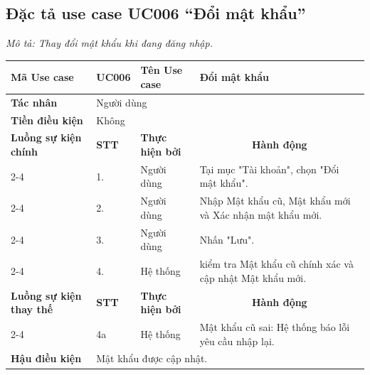 \documentclass[../main.tex]{subfiles}
\begin{document}
\subsection{Đặc tả use case UC006 ``Đổi mật khẩu''}
\textit{Mô tả: Thay đổi mật khẩu khi đang đăng nhập.}
\vspace{0.5cm}

\begingroup
\renewcommand{\arraystretch}{1.5}

\begin{longtable}{|p{2.7cm}|p{0.8cm}|p{2.6cm}|p{7.3cm}|}
\hline
\cellcolor[HTML]{D5F5E3}\textbf{Mã Use case} & \multicolumn{1}{l|}{UC006} & \cellcolor[HTML]{D5F5E3}\textbf{Tên Use case} & Đổi mật khẩu \\ \hline
\cellcolor[HTML]{D5F5E3}\textbf{Tác nhân} & \multicolumn{3}{p{10.7cm}|}{Người dùng} \\ \hline
\cellcolor[HTML]{D5F5E3}\textbf{Tiền điều kiện} & \multicolumn{3}{p{10.7cm}|}{Không} \\ \hline

\cellcolor[HTML]{D5F5E3}\textbf{Luồng sự kiện chính} & \cellcolor[HTML]{FDEBD0}\textbf{STT} & \cellcolor[HTML]{FDEBD0}\textbf{Thực hiện bởi} & \multicolumn{1}{c|}{\cellcolor[HTML]{FDEBD0}\textbf{Hành động}} \\ \cline{2-4} 
\cellcolor[HTML]{D5F5E3} & 1. & Người dùng & Tại mục "Tài khoản", chọn "Đổi mật khẩu". \\ \cline{2-4} 
\cellcolor[HTML]{D5F5E3} & 2. & Người dùng & Nhập Mật khẩu cũ, Mật khẩu mới và Xác nhận mật khẩu mới. \\ \cline{2-4} 
\cellcolor[HTML]{D5F5E3} & 3. & Người dùng & Nhấn "Lưu". \\ \cline{2-4} 
\cellcolor[HTML]{D5F5E3} & 4. & Hệ thống & kiểm tra Mật khẩu cũ chính xác và cập nhật Mật khẩu mới. \\ \hline

\cellcolor[HTML]{D5F5E3}\textbf{Luồng sự kiện thay thế} & \cellcolor[HTML]{FDEBD0}\textbf{STT} & \cellcolor[HTML]{FDEBD0}\textbf{Thực hiện bởi} & \multicolumn{1}{c|}{\cellcolor[HTML]{FDEBD0}\textbf{Hành động}} \\ \cline{2-4} 
\cellcolor[HTML]{D5F5E3} & 4a & Hệ thống & Mật khẩu cũ sai: Hệ thống báo lỗi yêu cầu nhập lại. \\ \hline

\cellcolor[HTML]{D5F5E3}\textbf{Hậu điều kiện} & \multicolumn{3}{p{10.7cm}|}{Mật khẩu được cập nhật.} \\ \hline
\end{longtable}
\endgroup
\end{document}
